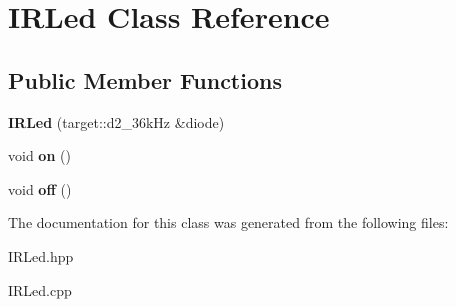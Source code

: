 \hypertarget{class_i_r_led}{}\section{I\+R\+Led Class Reference}
\label{class_i_r_led}
\subsection*{Public Member Functions}
\begin{DoxyCompactItemize}
\item 
{\bfseries I\+R\+Led} (target\+::d2\+\_\+36k\+Hz \&diode)\hypertarget{class_i_r_led_a02838f19956f2ef4a3fb2754a2913b80}{}\label{class_i_r_led_a02838f19956f2ef4a3fb2754a2913b80}

\item 
void {\bfseries on} ()\hypertarget{class_i_r_led_ad84cfe4ff053471f6caafd720cb8a1e9}{}\label{class_i_r_led_ad84cfe4ff053471f6caafd720cb8a1e9}

\item 
void {\bfseries off} ()\hypertarget{class_i_r_led_a5780650c08a186a6b970f56d1ac78775}{}\label{class_i_r_led_a5780650c08a186a6b970f56d1ac78775}

\end{DoxyCompactItemize}


The documentation for this class was generated from the following files\+:\begin{DoxyCompactItemize}
\item 
I\+R\+Led.\+hpp\item 
I\+R\+Led.\+cpp\end{DoxyCompactItemize}
